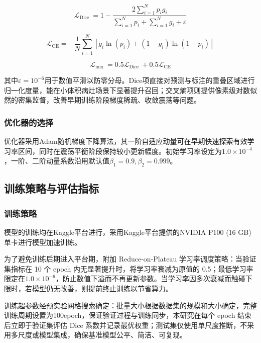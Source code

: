\begin{equation}
    \mathcal{L}_{\text {Dice }}=1-\frac{2 \sum_{i=1}^{N} p_{i} g_{i}}{\sum_{i=1}^{N} p_{i}+\sum_{i=1}^{N} g_{i}+\varepsilon}
\end{equation}

\begin{equation}
    \mathcal{L}_{\mathrm{CE}}=-\frac{1}{N} \sum_{i=1}^{N}\left[g_{i} \ln \left(p_{i}\right)+\left(1-g_{i}\right) \ln \left(1-p_{i}\right)\right]
\end{equation}

\begin{equation}
    \mathcal{L}_{\text {mix }}=0.5 \mathcal{L}_{\text {Dice }}+0.5 \mathcal{L}_{\mathrm{CE}}
\end{equation}

其中$ \varepsilon=10^{-6} $用于数值平滑以防零分母。Dice项直接对预测与标注的重叠区域进行归一化度量，能在小体积病灶场景下显著提升召回；交叉熵项则提供像素级对数似然的密集监督，改善早期训练阶段梯度稀疏、收敛震荡等问题。

\subsubsection{优化器的选择}

优化器采用Adam随机梯度下降算法，其一阶自适应动量可在早期快速探索有效学习率区间，同时在震荡平衡阶段保持较小更新幅度。初始学习率设定为$ 1.0 \times 10^{-4} $，一阶、二阶动量系数沿用默认值$ \beta_{1}=0.9, \beta_{2}=0.999 $。

\subsection{训练策略与评估指标}

\subsubsection{训练策略}

模型的训练均在Kaggle平台进行，采用Kaggle平台提供的NVIDIA P100 (16 GB) 单卡进行模型加速训练。

为了避免训练后期进入平台期，附加 Reduce-on-Plateau 学习率调度策略：当验证集指标在 10 个 epoch 内无显著提升时，将学习率衰减为原值的 0.5；最低学习率限定在$ 1.0 \times 10^{-6} $，防止数值下溢而不再更新参数。当学习率因多次衰减而触碰下限时，若模型仍无改善，则提前终止训练以节省算力。

训练超参数经预实验网格搜索确定：批量大小根据数据集的规模和大小确定，完整训练周期设置为100epoch，保证验证过程与训练同步，本研究在每个 epoch 结束后立即于验证集评估 Dice 系数并记录最优权重；测试集仅使用单尺度推断，不采用多尺度或模型集成，确保基准模型公平、简洁、可复现。

